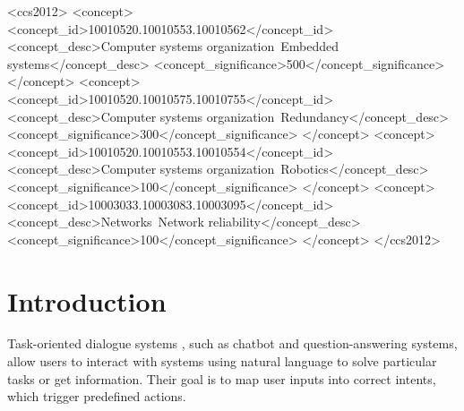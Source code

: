 \documentclass[sigconf, anonymous=true]{acmart}
\begin{document}
\begin{CCSXML}
<ccs2012>
 <concept>
  <concept_id>10010520.10010553.10010562</concept_id>
  <concept_desc>Computer systems organization~Embedded systems</concept_desc>
  <concept_significance>500</concept_significance>
 </concept>
 <concept>
  <concept_id>10010520.10010575.10010755</concept_id>
  <concept_desc>Computer systems organization~Redundancy</concept_desc>
  <concept_significance>300</concept_significance>
 </concept>
 <concept>
  <concept_id>10010520.10010553.10010554</concept_id>
  <concept_desc>Computer systems organization~Robotics</concept_desc>
  <concept_significance>100</concept_significance>
 </concept>
 <concept>
  <concept_id>10003033.10003083.10003095</concept_id>
  <concept_desc>Networks~Network reliability</concept_desc>
  <concept_significance>100</concept_significance>
 </concept>
</ccs2012>
\end{CCSXML}




\maketitle

\section{Introduction}
Task-oriented dialogue systems \cite{zhang2020recent}, such as chatbot and question-answering systems, allow users to interact with systems using natural language to solve particular tasks or get information. Their goal is to map user inputs into correct intents, which trigger predefined actions. 
\end{document}
